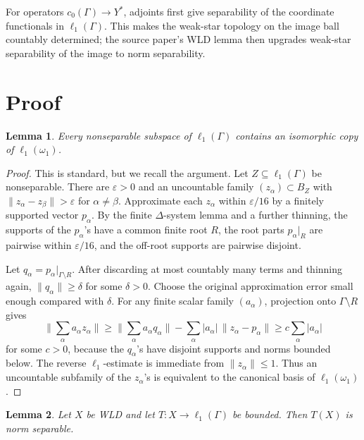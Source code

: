\documentclass[11pt]{article}
\newtheorem{lemma}{Lemma}
\begin{document}
For operators \(c_0(\Gamma)\to Y^*\), adjoints first give separability of the
coordinate functionals in \(\ell_1(\Gamma)\). This makes the weak-star topology
on the image ball countably determined; the source paper's WLD lemma then
upgrades weak-star separability of the image to norm separability.

\section*{Proof}

\begin{lemma}\label{lem:l1-subspace}
Every nonseparable subspace of \(\ell_1(\Gamma)\) contains an isomorphic copy
of \(\ell_1(\omega_1)\).
\end{lemma}

\begin{proof}
This is standard, but we recall the argument. Let \(Z\subseteq \ell_1(\Gamma)\)
be nonseparable. There are \(\varepsilon>0\) and an uncountable family
\((z_\alpha)\subset B_Z\) with
\(\|z_\alpha-z_\beta\|>\varepsilon\) for \(\alpha\ne\beta\). Approximate each
\(z_\alpha\) within \(\varepsilon/16\) by a finitely supported vector
\(p_\alpha\). By the finite \(\Delta\)-system lemma and a further thinning,
the supports of the \(p_\alpha\)'s have a common finite root \(R\), the root
parts \(p_\alpha|_R\) are pairwise within \(\varepsilon/16\), and the off-root
supports are pairwise disjoint.

Let \(q_\alpha=p_\alpha|_{\Gamma\setminus R}\). After discarding at most
countably many terms and thinning again, \(\|q_\alpha\|\ge \delta\) for some
\(\delta>0\). Choose the original approximation error small enough compared
with \(\delta\). For any finite scalar family \((a_\alpha)\), projection onto
\(\Gamma\setminus R\) gives
\[
\Big\|\sum_\alpha a_\alpha z_\alpha\Big\|
\ge
\Big\|\sum_\alpha a_\alpha q_\alpha\Big\|
-
\sum_\alpha |a_\alpha|\,\|z_\alpha-p_\alpha\|
\ge c\sum_\alpha |a_\alpha|
\]
for some \(c>0\), because the \(q_\alpha\)'s have disjoint supports and norms
bounded below. The reverse \(\ell_1\)-estimate is immediate from
\(\|z_\alpha\|\le 1\). Thus an uncountable subfamily of the \(z_\alpha\)'s is
equivalent to the canonical basis of \(\ell_1(\omega_1)\).
\end{proof}

\begin{lemma}\label{lem:wld-to-l1}
Let \(X\) be WLD and let \(T:X\to \ell_1(\Gamma)\) be bounded. Then \(T(X)\)
is norm separable.
\end{lemma}
\end{document}
